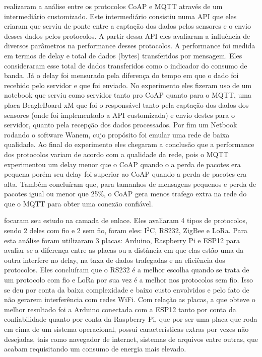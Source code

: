 \cite{thangavel2014commonMiddleware} realizaram a análise entre os protocolos CoAP e MQTT através de um intermediário customizado. Este intermediário consistiu numa API que eles criaram que serviu de ponte entre a captação dos dados pelos sensores e o envio desses dados pelos protocolos. A partir dessa API eles avaliaram a influência de diversos parâmetros na performance desses protocolos. A performance foi medida em termos de delay e total de dados (bytes) transferidos por mensagem. Eles consideraram esse total de dados transferidos como o indicador do consumo de banda. Já o delay foi mensurado pela diferença do tempo em que o dado foi recebido pelo servidor e que foi enviado.
No experimento eles fizeram uso de um notebook que serviu como servidor tanto pro CoAP quanto para o MQTT, uma placa BeagleBoard-xM que foi o responsável tanto pela captação dos dados dos sensores (onde foi implementado a API customizada) e envio destes para o servidor, quanto pela recepção dos dados processados. Por fim um Netbook rodando o software Wanem, cujo propósito foi emular uma rede de baixa qualidade.
Ao final do experimento eles chegaram a conclusão que a performance dos protocolos variam de acordo com a qualidade da rede, pois o MQTT experimentou um delay menor que o CoAP quando o a perda de pacotes era pequena porém seu delay foi superior ao CoAP quando a perda de pacotes era alta. Também concluíram que, para tamanhos de mensagens pequenos e perda de pacotes igual ou menor que 25\%, o CoAP gera menos trafego extra na rede do que o MQTT para obter uma conexão confiável.

\cite{gloria2017comparison} focaram seu estudo na camada de enlace. Eles avaliaram 4 tipos de protocolos, sendo 2 deles com fio e 2 sem fio, foram eles: I$^{2}$C, RS232, ZigBee e LoRa. Para esta análise foram utilizaram 3 placas: Arduino, Raspberry Pi e ESP12 para avaliar se a diferença entre as placas ou a distância em que elas estão uma da outra interfere no delay, na taxa de dados trafegadas e na eficiência dos protocolos. Eles concluíram que o RS232 é a melhor escolha quando se trata de um protocolo com fio e LoRa por sua vez é a melhor nos protocolos sem fio. Isso se deu por conta da baixa complexidade e baixo custo envolvidos e pelo fato de não gerarem interferência com redes WiFi. Com relação as placas, a que obteve o melhor resultado foi a Arduino conectada com a ESP12 tanto por conta da confiabilidade quanto por conta da Raspberry Pi, que por ser uma placa que roda em cima de um sistema operacional, possui características extras por vezes não desejadas, tais como navegador de internet, sistemas de arquivos entre outras, que acabam requisitando um consumo de energia mais elevado.


